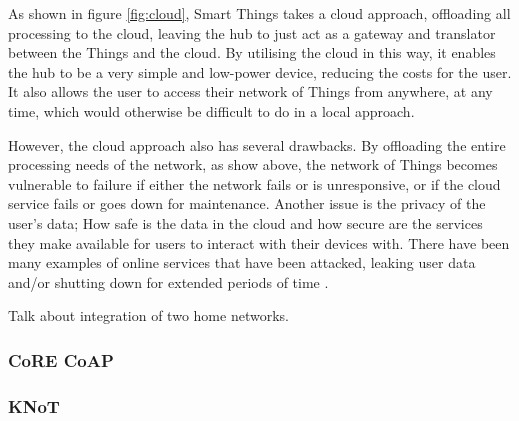 As shown in figure \ref{fig:cloud}, Smart Things takes a cloud approach, offloading all processing to the cloud, leaving the hub to just act as a gateway and translator between the Things and the cloud. By utilising the cloud in this way, it enables the hub to be a very simple and low-power device, reducing the costs for the user. It also allows the user to access their network of Things from anywhere, at any time, which would otherwise be difficult to do in a local approach. 

However, the cloud approach also has several drawbacks. By offloading the entire processing needs of the network, as show above, the network of Things becomes vulnerable to failure if either the network fails or is unresponsive, or if the cloud service fails or goes down for maintenance. Another issue is the privacy of the user's data; How safe is the data in the cloud and how secure are the services they make available for users to interact with their devices with. There have been many examples of online services that have been attacked, leaking user data and/or shutting down for extended periods of time \cite{Playstation, Amazon, Google}.

Talk about integration of two home networks.



\subsubsection{CoRE CoAP} %
\label{ssub:core_coap}

\subsubsection{KNoT} %
\label{ssub:knot}

